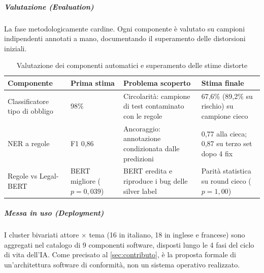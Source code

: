 \documentclass[12pt,a4paper,oneside]{report}
\begin{document}
\subparagraph{Valutazione (Evaluation)}
La fase metodologicamente cardine. Ogni componente è valutato su campioni indipendenti annotati a mano, documentando il superamento delle distorsioni iniziali.

\begin{table}[htbp]
    \centering
    \caption{Valutazione dei componenti automatici e superamento delle stime distorte}
    \label{tab:valutazione_modelli}
    \begin{tabular}{|p{3.2cm}|p{2.1cm}|p{4.2cm}|p{3.1cm}|}
        \hline
        \textbf{Componente} & \textbf{Prima stima} & \textbf{Problema scoperto} & \textbf{Stima finale} \\
        \hline
        Classificatore tipo di obbligo & 98\% & Circolarità: campione di test contaminato con le regole & 67,6\% (89,2\% su rischio) su campione cieco \\
        \hline
        NER a regole & F1 0,86 & Ancoraggio: annotazione condizionata dalle predizioni & 0,77 alla cieca; 0,87 su terzo set dopo 4 fix \\
        \hline
        Regole vs Legal-BERT & BERT migliore ($p = 0{,}039$) & BERT eredita e riproduce i bug delle silver label & Parità statistica su round cieco ($p = 1{,}00$) \\
        \hline
    \end{tabular}
\end{table}

\subparagraph{Messa in uso (Deployment)}
I cluster bivariati attore $\times$ tema (16 in italiano, 18 in inglese e francese) sono aggregati nel catalogo di 9 componenti software, disposti lungo le 4 fasi del ciclo di vita dell'IA. Come precisato al \ref{sec:contributo}, è la proposta formale di un'architettura software di conformità, non un sistema operativo realizzato.
\end{document}

